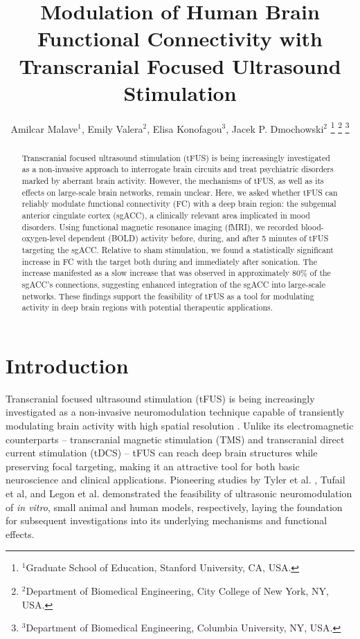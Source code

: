 \documentclass[conference]{ieeeconf}
\title{Modulation of Human Brain Functional Connectivity with Transcranial Focused Ultrasound Stimulation}
\author{Amilcar Malave$^{1}$, Emily Valera$^{2}$, Elisa Konofagou$^{3}$, Jacek P. Dmochowski$^{2}$
\thanks{$^{1}$Graduate School of Education, Stanford University, CA, USA.}
\thanks{$^{2}$Department of Biomedical Engineering, City College of New York, NY, USA.}
\thanks{$^{3}$Department of Biomedical Engineering, Columbia University, NY, USA.}}
\begin{document}
\maketitle

\begin{abstract} \noindent
Transcranial focused ultrasound stimulation (tFUS) is being increasingly investigated as a non-invasive approach to interrogate brain circuits and treat psychiatric disorders marked by aberrant brain activity. However, the mechanisms of tFUS, as well as its effects on large-scale brain networks, remain unclear. Here, we asked whether tFUS can reliably modulate functional connectivity (FC) with a deep brain region: the subgenual anterior cingulate cortex (sgACC), a clinically relevant area implicated in mood disorders. Using functional magnetic resonance imaging (fMRI), we recorded blood-oxygen-level dependent (BOLD) activity before, during, and after 5 minutes of tFUS targeting the sgACC. Relative to sham stimulation, we found a statistically significant increase in FC with the target both during and immediately after sonication. The increase manifested as a slow increase that was observed in approximately 80\% of the sgACC's connections, suggesting enhanced integration of the sgACC into large-scale networks. These findings support the feasibility of tFUS as a tool for modulating activity in deep brain regions with potential therapeutic applications. 
\end{abstract}

\section{Introduction} \noindent
Transcranial focused ultrasound stimulation (tFUS) is being increasingly investigated as a non-invasive neuromodulation technique capable of transiently modulating brain activity with high spatial resolution \cite{Naor2016-wz,blackmore2019mechanisms}. Unlike its electromagnetic counterparts -- transcranial magnetic stimulation (TMS) and transcranial direct current stimulation (tDCS) --  tFUS can reach deep brain structures while preserving focal targeting, making it an attractive tool for both basic neuroscience and clinical applications. Pioneering studies by Tyler et al. \cite{Tyler2008-zs}, Tufail et al, \cite{Tufail2010-jd} and Legon et al. \cite{legon2014transcranial} demonstrated the feasibility of ultrasonic neuromodulation of \emph{in vitro}, small animal and human models, respectively, laying the foundation for subsequent investigations into its underlying mechanisms and functional effects. 
\end{document}
